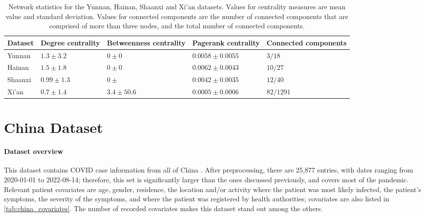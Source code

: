 \begin{table}
	\begin{tabularx}{\linewidth}{XXXXX}
		\hline
		\textbf{Dataset} & \textbf{Degree centrality} & \textbf{Betweenness centrality} & \textbf{Pagerank centrality} & \textbf{Connected components} \\
		\hline
		Yunnan & $1.3\pm3.2$ & $0\pm0$ & $0.0058\pm0.0055$ & $3/18$ \\
		Hainan & $1.5\pm1.8$ & $0\pm0$ & $0.0062\pm0.0043$ & $10/27$ \\
		Shaanxi & $0.99\pm1.3$ & $0\pm$ & $0.0042\pm0.0035$ & $12/40$ \\
		Xi'an & $0.7\pm1.4$ & $3.4\pm50.6$ & $0.0005\pm0.0006$ & $82/1291$\\
		\hline
	\end{tabularx}
	\caption{Network statistics for the Yunnan, Hainan, Shaanxi and Xi'an datasets. Values for centrality measures are mean value and standard deviation. Values for connected components are the number of connected components that are comprised of more than three nodes, and the total number of connected components.}
	\label{tab:network_stats}
\end{table}

\section{China Dataset}
\label{sec:china_data}

\paragraph{Dataset overview} This dataset contains COVID case information from all of China \cite{china_publication,china_data}. After preprocessing, there are 25,877 entries, with dates ranging from 2020-01-01 to 2022-08-14; therefore, this set is significantly larger than the ones discussed previously, and covers most of the pandemic. Relevant patient covariates are age, gender, residence, the location and/or activity where the patient was most likely infected, the patient's symptoms, the severity of the symptoms, and where the patient was registered by health authorities; covariates are also listed in \ref{tab:china_covariates}. The number of recorded covariates makes this dataset stand out among the others.

